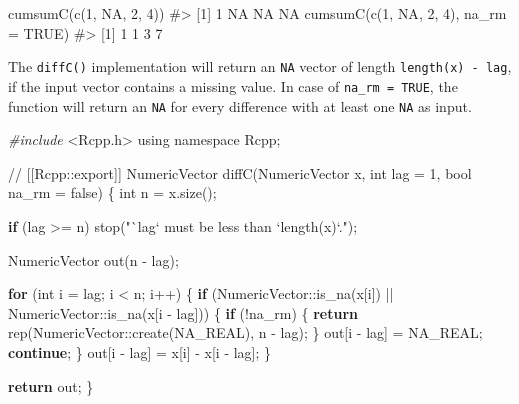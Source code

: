 \documentclass[
]{krantz}
\makeatletter
\newenvironment{Shaded}{\begin{snugshade}}{\end{snugshade}}
\newcommand{\CommentTok}[1]{\textcolor[rgb]{0.56,0.35,0.01}{\textit{#1}}}
\newcommand{\ControlFlowTok}[1]{\textcolor[rgb]{0.13,0.29,0.53}{\textbf{#1}}}
\newcommand{\DataTypeTok}[1]{\textcolor[rgb]{0.13,0.29,0.53}{#1}}
\newcommand{\DecValTok}[1]{\textcolor[rgb]{0.00,0.00,0.81}{#1}}
\newcommand{\ImportTok}[1]{#1}
\newcommand{\KeywordTok}[1]{\textcolor[rgb]{0.13,0.29,0.53}{\textbf{#1}}}
\newcommand{\NormalTok}[1]{#1}
\newcommand{\OtherTok}[1]{\textcolor[rgb]{0.56,0.35,0.01}{#1}}
\newcommand{\PreprocessorTok}[1]{\textcolor[rgb]{0.56,0.35,0.01}{\textit{#1}}}
\newcommand{\StringTok}[1]{\textcolor[rgb]{0.31,0.60,0.02}{#1}}
\newenvironment{kframe}{%
\medskip{}
\setlength{\fboxsep}{.8em}
 \def\at@end@of@kframe{}%
 \ifinner\ifhmode%
  \def\at@end@of@kframe{\end{minipage}}%
  \begin{minipage}{\columnwidth}%
 \fi\fi%
 \def\FrameCommand##1{\hskip\@totalleftmargin \hskip-\fboxsep
 \colorbox{shadecolor}{##1}\hskip-\fboxsep
     \hskip-\linewidth \hskip-\@totalleftmargin \hskip\columnwidth}%
 \MakeFramed {\advance\hsize-\width
   \@totalleftmargin\z@ \linewidth\hsize
   \@setminipage}}%
 {\par\unskip\endMakeFramed%
 \at@end@of@kframe}
\renewenvironment{Shaded}{\begin{kframe}}{\end{kframe}}
\renewcommand{\KeywordTok} [1]{\textcolor[rgb]{0.00,0.44,0.13}{{#1}}}
\renewcommand{\DataTypeTok}[1]{\textcolor[rgb]{0.56,0.13,0.00}{{#1}}}
\renewcommand{\DecValTok}  [1]{\textcolor[rgb]{0.25,0.63,0.44}{{#1}}}
\renewcommand{\StringTok}  [1]{\textcolor[rgb]{0.25,0.44,0.63}{{#1}}}
\renewcommand{\CommentTok} [1]{\textcolor[rgb]{0.38,0.63,0.69}{{#1}}}
\renewcommand{\OtherTok}   [1]{\textcolor[rgb]{0.00,0.44,0.13}{{#1}}}
\renewcommand{\NormalTok}  [1]{{#1}}
\makeatother
\begin{document}
\begin{Shaded}
\begin{Highlighting}[]
\KeywordTok{cumsumC}\NormalTok{(}\KeywordTok{c}\NormalTok{(}\DecValTok{1}\NormalTok{, }\OtherTok{NA}\NormalTok{, }\DecValTok{2}\NormalTok{, }\DecValTok{4}\NormalTok{))}
\CommentTok{#> [1]  1 NA NA NA}
\KeywordTok{cumsumC}\NormalTok{(}\KeywordTok{c}\NormalTok{(}\DecValTok{1}\NormalTok{, }\OtherTok{NA}\NormalTok{, }\DecValTok{2}\NormalTok{, }\DecValTok{4}\NormalTok{), }\DataTypeTok{na_rm =} \OtherTok{TRUE}\NormalTok{)}
\CommentTok{#> [1] 1 1 3 7}
\end{Highlighting}
\end{Shaded}

The \texttt{diffC()} implementation will return an \texttt{NA} vector of length \texttt{length(x)\ -\ lag}, if the input vector contains a missing value. In case of \texttt{na\_rm\ =\ TRUE}, the function will return an \texttt{NA} for every difference with at least one \texttt{NA} as input.

\begin{Shaded}
\begin{Highlighting}[]
\PreprocessorTok{#include }\ImportTok{<Rcpp.h>}
\KeywordTok{using} \KeywordTok{namespace}\NormalTok{ Rcpp;}

\CommentTok{// [[Rcpp::export]]}
\NormalTok{NumericVector diffC(NumericVector x, }\DataTypeTok{int}\NormalTok{ lag = }\DecValTok{1}\NormalTok{,}
                    \DataTypeTok{bool}\NormalTok{ na_rm = }\KeywordTok{false}\NormalTok{) \{}
  \DataTypeTok{int}\NormalTok{ n = x.size();}
  
  \ControlFlowTok{if}\NormalTok{ (lag >= n) stop(}\StringTok{"`lag` must be less than `length(x)`."}\NormalTok{);}
  
\NormalTok{  NumericVector out(n - lag);}
  
  \ControlFlowTok{for}\NormalTok{ (}\DataTypeTok{int}\NormalTok{ i = lag; i < n; i++) \{}
    \ControlFlowTok{if}\NormalTok{ (NumericVector::is_na(x[i]) ||}
\NormalTok{        NumericVector::is_na(x[i - lag])) \{}
      \ControlFlowTok{if}\NormalTok{ (!na_rm) \{}
        \ControlFlowTok{return}\NormalTok{ rep(NumericVector::create(NA_REAL), n - lag);}
\NormalTok{      \}}
\NormalTok{      out[i - lag] = NA_REAL;}
      \ControlFlowTok{continue}\NormalTok{;}
\NormalTok{    \}}
\NormalTok{    out[i - lag] = x[i] - x[i - lag];}
\NormalTok{  \}}
  
  \ControlFlowTok{return}\NormalTok{ out;}
\NormalTok{\}}
\end{Highlighting}
\end{Shaded}
\end{document}
